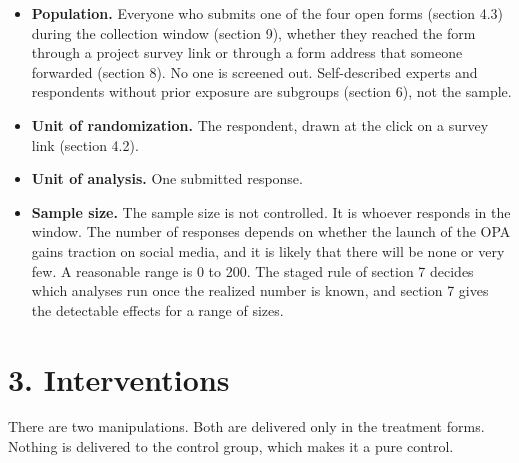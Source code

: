 \begin{itemize}
\tightlist
\item
  \textbf{Population.} Everyone who submits one of the four open forms (section 4.3) during the
  collection window (section 9), whether they reached the form through a project survey link or
  through a form address that someone forwarded (section 8). No one is screened out. Self-described experts and
  respondents without prior exposure are subgroups (section 6), not the sample.
\item
  \textbf{Unit of randomization.} The respondent, drawn at the click on a survey link (section 4.2).
\item
  \textbf{Unit of analysis.} One submitted response.
\item
  \textbf{Sample size.} The sample size is not controlled. It is whoever responds in the window. The number of
  responses depends on whether the launch of the OPA gains traction on social media, and it is
  likely that there will be none or very few. A reasonable range is 0 to 200. The staged rule of section 7 decides which analyses run once the realized number
  is known, and section 7 gives the detectable effects for a range of sizes.
\end{itemize}

\section{3. Interventions}\label{interventions}

There are two manipulations. Both are delivered only in the treatment forms. Nothing is delivered
to the control group, which makes it a pure control.

